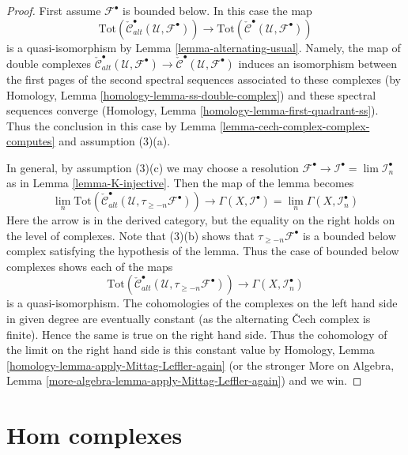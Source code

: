 \begin{proof}
First assume $\mathcal{F}^\bullet$ is bounded below. In this case the map
$$
\text{Tot}(\check{\mathcal{C}}^\bullet_{alt}(\mathcal{U}, \mathcal{F}^\bullet))
\longrightarrow
\text{Tot}(\check{\mathcal{C}}^\bullet(\mathcal{U}, \mathcal{F}^\bullet))
$$
is a quasi-isomorphism by Lemma \ref{lemma-alternating-usual}.
Namely, the map of double complexes
$\check{\mathcal{C}}^\bullet_{alt}(\mathcal{U}, \mathcal{F}^\bullet) \to
\check{\mathcal{C}}^\bullet(\mathcal{U}, \mathcal{F}^\bullet)$
induces an isomorphism between the first pages of the second spectral sequences
associated to these complexes
(by Homology, Lemma \ref{homology-lemma-ss-double-complex})
and these spectral sequences converge
(Homology, Lemma \ref{homology-lemma-first-quadrant-ss}).
Thus the conclusion in this case by
Lemma \ref{lemma-cech-complex-complex-computes} and assumption (3)(a).

\medskip\noindent
In general, by assumption (3)(c) we may choose a resolution
$\mathcal{F}^\bullet \to \mathcal{I}^\bullet = \lim \mathcal{I}_n^\bullet$
as in Lemma \ref{lemma-K-injective}.
Then the map of the lemma becomes
$$
\lim_n
\text{Tot}(\check{\mathcal{C}}^\bullet_{alt}(\mathcal{U},
\tau_{\geq -n}\mathcal{F}^\bullet))
\longrightarrow
\Gamma(X, \mathcal{I}^\bullet) =
\lim_n \Gamma(X, \mathcal{I}_n^\bullet)
$$
Here the arrow is in the derived category, but the equality on the
right holds on the level of complexes.
Note that (3)(b) shows that $\tau_{\geq -n}\mathcal{F}^\bullet$
is a bounded below complex satisfying the hypothesis of the lemma.
Thus the case of bounded below complexes shows each of the maps
$$
\text{Tot}(\check{\mathcal{C}}^\bullet_{alt}(\mathcal{U},
\tau_{\geq -n}\mathcal{F}^\bullet))
\longrightarrow
\Gamma(X, \mathcal{I}_n^\bullet)
$$
is a quasi-isomorphism. The cohomologies of the complexes on the left
hand side in given degree are eventually
constant (as the alternating {\v C}ech complex is finite).
Hence the same is true on the right hand side.
Thus the cohomology of the limit on the right hand side is
this constant value by
Homology, Lemma \ref{homology-lemma-apply-Mittag-Leffler-again}
(or the stronger More on Algebra, Lemma
\ref{more-algebra-lemma-apply-Mittag-Leffler-again})
and we win.
\end{proof}






\section{Hom complexes}
\label{section-hom-complexes}

